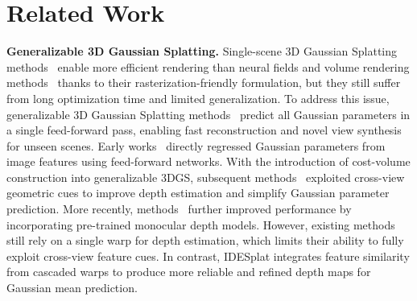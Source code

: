 \section{Related Work}
\label{sec:related_work}

\noindent \textbf{Generalizable 3D Gaussian Splatting.}
Single-scene 3D Gaussian Splatting methods~\cite{kerbl20233d, fan2024instantsplat, yan2024street, niemeyer2025radsplat, feng2025flashgs} enable more efficient rendering than neural fields and volume rendering methods~\cite{lombardi2019neural, sitzmann2020implicit, mildenhall2021nerf, xie2022neural} thanks to their rasterization-friendly formulation, but they still suffer from long optimization time and limited generalization.
%
To address this issue, generalizable 3D Gaussian Splatting methods~\cite{charatan2024pixelsplat, tang2024hisplat, liu2025monosplat, xu2025depthsplat} predict all Gaussian parameters in a single feed-forward pass, enabling fast reconstruction and novel view synthesis for unseen scenes.
%
Early works~\cite{charatan2024pixelsplat, szymanowicz2024splatter} directly regressed Gaussian parameters from image features using feed-forward networks.
%
With the introduction of cost-volume construction into generalizable 3DGS, subsequent methods~\cite{chen2024mvsplat, liu2024mvsgaussian} exploited cross-view geometric cues to improve depth estimation and simplify Gaussian parameter prediction.
%
More recently, methods~\cite{xu2025depthsplat, liu2025monosplat} further improved performance by incorporating pre-trained monocular depth models.
%
However, existing methods still rely on a single warp for depth estimation, which limits their ability to fully exploit cross-view feature cues.
%
In contrast, IDESplat integrates feature similarity from cascaded warps to produce more reliable and refined depth maps for Gaussian mean prediction.


